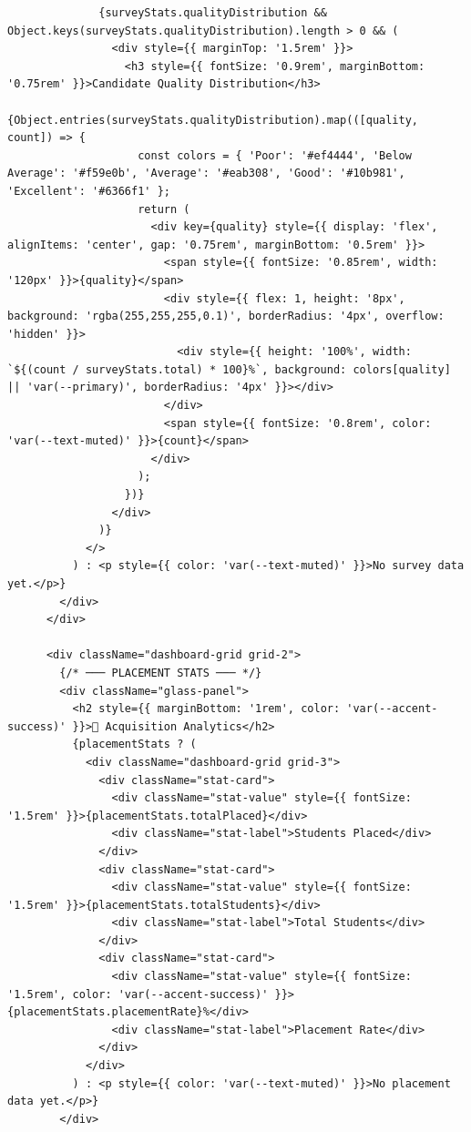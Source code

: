 \documentclass[12pt,a4paper]{report}
\begin{document}
\begin{verbatim}
              {surveyStats.qualityDistribution && Object.keys(surveyStats.qualityDistribution).length > 0 && (
                <div style={{ marginTop: '1.5rem' }}>
                  <h3 style={{ fontSize: '0.9rem', marginBottom: '0.75rem' }}>Candidate Quality Distribution</h3>
                  {Object.entries(surveyStats.qualityDistribution).map(([quality, count]) => {
                    const colors = { 'Poor': '#ef4444', 'Below Average': '#f59e0b', 'Average': '#eab308', 'Good': '#10b981', 'Excellent': '#6366f1' };
                    return (
                      <div key={quality} style={{ display: 'flex', alignItems: 'center', gap: '0.75rem', marginBottom: '0.5rem' }}>
                        <span style={{ fontSize: '0.85rem', width: '120px' }}>{quality}</span>
                        <div style={{ flex: 1, height: '8px', background: 'rgba(255,255,255,0.1)', borderRadius: '4px', overflow: 'hidden' }}>
                          <div style={{ height: '100%', width: `${(count / surveyStats.total) * 100}%`, background: colors[quality] || 'var(--primary)', borderRadius: '4px' }}></div>
                        </div>
                        <span style={{ fontSize: '0.8rem', color: 'var(--text-muted)' }}>{count}</span>
                      </div>
                    );
                  })}
                </div>
              )}
            </>
          ) : <p style={{ color: 'var(--text-muted)' }}>No survey data yet.</p>}
        </div>
      </div>

      <div className="dashboard-grid grid-2">
        {/* ─── PLACEMENT STATS ─── */}
        <div className="glass-panel">
          <h2 style={{ marginBottom: '1rem', color: 'var(--accent-success)' }}>💎 Acquisition Analytics</h2>
          {placementStats ? (
            <div className="dashboard-grid grid-3">
              <div className="stat-card">
                <div className="stat-value" style={{ fontSize: '1.5rem' }}>{placementStats.totalPlaced}</div>
                <div className="stat-label">Students Placed</div>
              </div>
              <div className="stat-card">
                <div className="stat-value" style={{ fontSize: '1.5rem' }}>{placementStats.totalStudents}</div>
                <div className="stat-label">Total Students</div>
              </div>
              <div className="stat-card">
                <div className="stat-value" style={{ fontSize: '1.5rem', color: 'var(--accent-success)' }}>{placementStats.placementRate}%</div>
                <div className="stat-label">Placement Rate</div>
              </div>
            </div>
          ) : <p style={{ color: 'var(--text-muted)' }}>No placement data yet.</p>}
        </div>


\end{verbatim}
\end{document}
